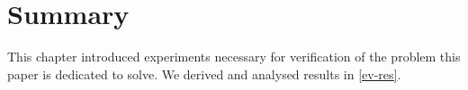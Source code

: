 \documentclass[main.tex]{subfiles}
\begin{document}
\section{Summary}
This chapter introduced experiments necessary for verification of the problem this paper is dedicated to solve.
We derived and analysed results in \ref{ev-res}.
\end{document}
